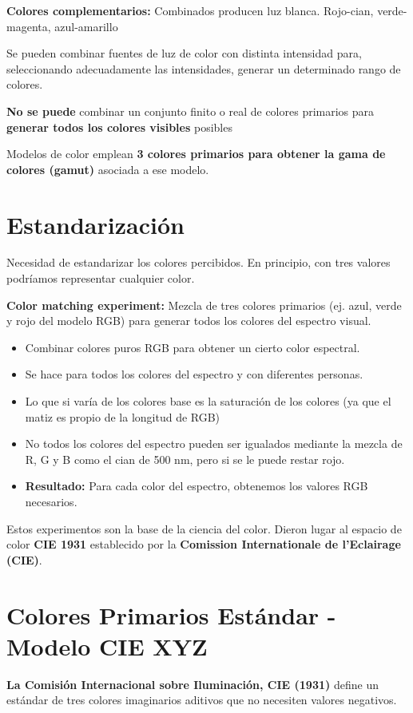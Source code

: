 \textbf{Colores complementarios:} Combinados producen luz blanca. Rojo-cian, verde-magenta, azul-amarillo

Se pueden combinar fuentes de luz de color con distinta intensidad para, seleccionando adecuadamente las intensidades, generar un determinado rango de colores.

\textbf{No se puede} combinar un conjunto finito o real de colores primarios para \textbf{generar todos los colores visibles} posibles

Modelos de color emplean \textbf{3 colores primarios para obtener la gama de colores (gamut)} asociada a ese modelo.

\section{Estandarización}
Necesidad de estandarizar los colores percibidos. En principio, con tres valores podríamos representar cualquier color.

\textbf{Color matching experiment:} Mezcla de tres colores primarios (ej. azul, verde y rojo del modelo RGB) para generar todos los colores del espectro visual.
\begin{itemize}
    \item Combinar colores puros RGB para obtener un cierto color espectral.
    \item Se hace para todos los colores del espectro y con diferentes personas.
    \item Lo que si varía de los colores base es la saturación de los colores (ya que el matiz es propio de la longitud de RGB)
    \item No todos los colores del espectro pueden ser igualados mediante la mezcla de R, G y B como el cian de 500 nm, pero si se le puede restar rojo.
    \item \textbf{Resultado:} Para cada color del espectro, obtenemos los valores RGB necesarios.
\end{itemize}

Estos experimentos son la base de la ciencia del color. Dieron lugar al espacio de color \textbf{CIE 1931} establecido por la \textbf{Comission Internationale de l'Eclairage (CIE)}.

\section{Colores Primarios Estándar - Modelo CIE XYZ}
\textbf{La Comisión Internacional sobre Iluminación, CIE (1931)} define un estándar de tres colores imaginarios aditivos que no necesiten valores negativos. 


